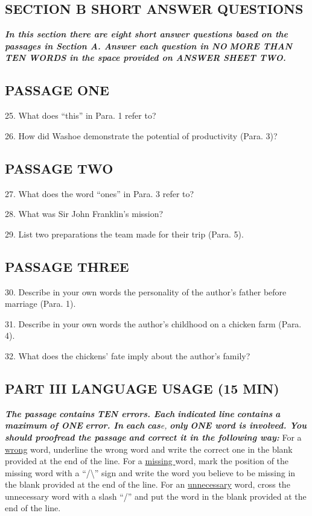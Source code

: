 \documentclass[UTF8,11pt]{ctexart}
\begin{document}
\subsection*{\textbf{SECTION B SHORT ANSWER QUESTIONS}}


\textbf{\textit{In this section there are eight short answer questions based on the passages in Section A. Answer each question in NO}} \textbf{\textit{MORE THAN TEN WORDS in the space provided on ANSWER SHEET TWO.}}


\subsection*{\textbf{PASSAGE ONE}}


25. What does “this” in Para. 1 refer to?


26. How did Washoe demonstrate the potential of productivity (Para. 3)?


\subsection*{\textbf{PASSAGE TWO}}


27. What does the word “ones” in Para. 3 refer to?


28. What was Sir John Franklin’s mission?


29. List two preparations the team made for their trip (Para. 5).


\subsection*{\textbf{PASSAGE THREE}}


30. Describe in your own words the personality of the author’s father before marriage (Para. 1).


31. Describe in your own words the author’s childhood on a chicken farm (Para. 4).


32. What does the chickens’ fate imply about the author’s family?


\subsection*{\textbf{PART III LANGUAGE USAGE (15 MIN)}}


\textbf{\textit{The passage}} \textbf{\textit{contains}} \textbf{\textit{TEN errors. Each}} \textbf{\textit{indicated line}} \textbf{\textit{contains}} \textbf{\textit{a maximum}} \textbf{\textit{of ONE}} \textbf{\textit{error. In}} \textbf{\textit{each}} \textbf{\textit{cas}}\textit{e, }\textbf{\textit{only}} \textbf{\textit{ONE word is involved. You should proofread the passage}} \textbf{\textit{and correct it in the following way:}} For a \uline{wrong} word, underline the wrong word and write the correct one in the blank provided at the end of the line. For a \uline{missing }word, mark the position of the missing word with a “/\textbackslash{}” sign and write the word you believe to be missing in the blank provided at the end of the line. For an \uline{unnecessary} word, cross the unnecessary word with a slash “/” and put the word in the blank provided at the end of the line.
\end{document}
